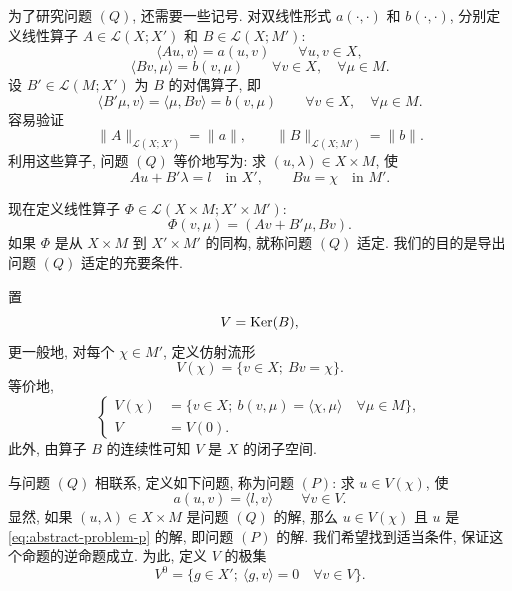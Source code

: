 为了研究问题 $(Q)$, 还需要一些记号. 对双线性形式
$a(\cdot,\cdot)$ 和 $b(\cdot,\cdot)$, 分别定义线性算子
$A\in\mathcal L(X;X')$ 和 $B\in\mathcal L(X;M')$:
\begin{equation}\label{eq:abstract-operator-a}
\langle Au,v\rangle=a(u,v)
\qquad\forall u,v\in X,
\end{equation}
\begin{equation}\label{eq:abstract-operator-b}
\langle Bv,\mu\rangle=b(v,\mu)
\qquad\forall v\in X,\quad\forall\mu\in M.
\end{equation}
设 $B'\in\mathcal L(M;X')$ 为 $B$ 的对偶算子, 即
\begin{equation}\label{eq:abstract-dual-operator-b}
\langle B'\mu,v\rangle=\langle\mu,Bv\rangle=b(v,\mu)
\qquad\forall v\in X,\quad\forall\mu\in M.
\end{equation}
容易验证
\begin{equation}\label{eq:abstract-operator-norms}
\|A\|_{\mathcal L(X;X')}=\|a\|,
\qquad
\|B\|_{\mathcal L(X;M')}=\|b\|.
\end{equation}
利用这些算子, 问题 $(Q)$ 等价地写为: 求 $(u,\lambda)\in X\times M$, 使
\[
Au+B'\lambda=l\quad\text{in }X',
\qquad
Bu=\chi\quad\text{in }M'.
\]

现在定义线性算子 $\Phi\in\mathcal L(X\times M;X'\times M')$:
\[
\Phi(v,\mu)=(Av+B'\mu,Bv).
\]
如果 $\Phi$ 是从 $X\times M$ 到 $X'\times M'$ 的同构,
就称问题 $(Q)$ 适定. 我们的目的是导出问题 $(Q)$ 适定的充要条件.

置
\[
V=\operatorname{Ker}(B),
\]
更一般地, 对每个 $\chi\in M'$, 定义仿射流形
\[
V(\chi)=\{v\in X;\ Bv=\chi\}.
\]
等价地,
\begin{equation}\label{eq:abstract-affine-manifold}
\left\{
\begin{aligned}
V(\chi)&=\{v\in X;\ b(v,\mu)=\langle\chi,\mu\rangle
\quad\forall\mu\in M\},\\
V&=V(0).
\end{aligned}
\right.
\end{equation}
此外, 由算子 $B$ 的连续性可知 $V$ 是 $X$ 的闭子空间.

与问题 $(Q)$ 相联系, 定义如下问题, 称为问题 $(P)$: 求 $u\in V(\chi)$, 使
\begin{equation}\label{eq:abstract-problem-p}
a(u,v)=\langle l,v\rangle
\qquad\forall v\in V.
\end{equation}
显然, 如果 $(u,\lambda)\in X\times M$ 是问题 $(Q)$ 的解,
那么 $u\in V(\chi)$ 且 $u$ 是 
\eqref{eq:abstract-problem-p} 的解, 即问题 $(P)$ 的解.
我们希望找到适当条件, 保证这个命题的逆命题成立. 为此, 定义 $V$ 的极集
\[
V^0=\{g\in X';\ \langle g,v\rangle=0\quad\forall v\in V\}.
\]


